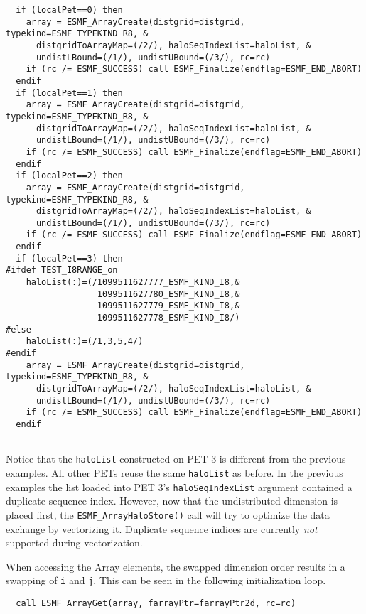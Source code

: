  \begin{verbatim}
  if (localPet==0) then
    array = ESMF_ArrayCreate(distgrid=distgrid, typekind=ESMF_TYPEKIND_R8, &
      distgridToArrayMap=(/2/), haloSeqIndexList=haloList, &
      undistLBound=(/1/), undistUBound=(/3/), rc=rc)
    if (rc /= ESMF_SUCCESS) call ESMF_Finalize(endflag=ESMF_END_ABORT)
  endif
  if (localPet==1) then
    array = ESMF_ArrayCreate(distgrid=distgrid, typekind=ESMF_TYPEKIND_R8, &
      distgridToArrayMap=(/2/), haloSeqIndexList=haloList, &
      undistLBound=(/1/), undistUBound=(/3/), rc=rc)
    if (rc /= ESMF_SUCCESS) call ESMF_Finalize(endflag=ESMF_END_ABORT)
  endif
  if (localPet==2) then
    array = ESMF_ArrayCreate(distgrid=distgrid, typekind=ESMF_TYPEKIND_R8, &
      distgridToArrayMap=(/2/), haloSeqIndexList=haloList, &
      undistLBound=(/1/), undistUBound=(/3/), rc=rc)
    if (rc /= ESMF_SUCCESS) call ESMF_Finalize(endflag=ESMF_END_ABORT)
  endif
  if (localPet==3) then
#ifdef TEST_I8RANGE_on
    haloList(:)=(/1099511627777_ESMF_KIND_I8,&
                  1099511627780_ESMF_KIND_I8,&
                  1099511627779_ESMF_KIND_I8,&
                  1099511627778_ESMF_KIND_I8/)
#else
    haloList(:)=(/1,3,5,4/)
#endif
    array = ESMF_ArrayCreate(distgrid=distgrid, typekind=ESMF_TYPEKIND_R8, &
      distgridToArrayMap=(/2/), haloSeqIndexList=haloList, &
      undistLBound=(/1/), undistUBound=(/3/), rc=rc)
    if (rc /= ESMF_SUCCESS) call ESMF_Finalize(endflag=ESMF_END_ABORT)
  endif
 
\end{verbatim}
 

   Notice that the {\tt haloList} constructed on PET 3 is different from the
   previous examples. All other PETs reuse the same {\tt haloList} as before.
   In the previous examples the list loaded into PET 3's
   {\tt haloSeqIndexList} argument contained a duplicate sequence index.
   However, now that the undistributed dimension is placed first, the 
   {\tt ESMF\_ArrayHaloStore()} call will try to optimize the data exchange by
   vectorizing it. Duplicate sequence indices are currently {\em not} supported
   during vectorization.
  
   When accessing the Array elements, the swapped dimension order results in 
   a swapping of {\tt i} and {\tt j}. This can be seen in the following
   initialization loop. 

 \begin{verbatim}
  call ESMF_ArrayGet(array, farrayPtr=farrayPtr2d, rc=rc)
 
\end{verbatim}
 
